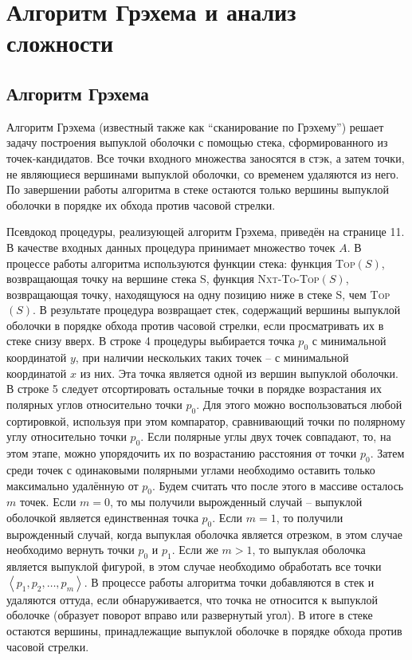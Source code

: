 \section{Алгоритм Грэхема и анализ сложности}

\subsection{Алгоритм Грэхема}

Алгоритм Грэхема (известный также как \textquotedblleft{}сканирование по Грэхему\textquotedblright{})\footnotemark{} решает задачу построения выпуклой оболочки с помощью стека, сформированного из точек-кандидатов. Все точки входного множества заносятся в стэк, а затем точки, не являющиеся вершинами выпуклой оболочки, со временем удаляются из него. По завершении работы алгоритма в стеке остаются только вершины выпуклой оболочки в порядке их обхода против часовой стрелки.


Псевдокод процедуры, реализующей алгоритм Грэхема, приведён на странице 11. В качестве входных данных процедура принимает множество точек $A$. В процессе работы алгоритма используются функции стека: функция \textsc{Top}$(S)$, возвращающая точку на вершине стека S, функция \textsc{Nxt-To-Top}$(S)$, возвращающая точку, находящуюся на одну позицию ниже в стеке S, чем \textsc{Top}$(S)$. В результате процедура возвращает стек, содержащий вершины выпуклой оболочки в порядке обхода против часовой стрелки, если просматривать их в стеке снизу вверх.
В строке 4 процедуры выбирается точка $p_0$ с минимальной координатой $y$, при наличии нескольких таких точек -- с минимальной координатой $x$ из них. Эта точка является одной из вершин выпуклой оболочки. В строке 5 следует отсортировать остальные точки в порядке возрастания их полярных углов относительно точки $p_0$. Для этого можно воспользоваться любой сортировкой, используя при этом компаратор, сравнивающий точки по полярному углу относительно точки $p_0$. Если полярные углы двух точек совпадают, то, на этом этапе, можно упорядочить их по возрастанию расстояния от точки $p_0$. Затем среди точек с одинаковыми полярными углами необходимо оставить только максимально удалённую от $p_0$. Будем считать что после этого в массиве осталось $m$ точек. Если $m = 0$, то мы получили вырожденный случай -- выпуклой оболочкой является единственная точка $p_0$. Если $m = 1$, то получили вырожденный случай, когда выпуклая оболочка является отрезком, в этом случае необходимо вернуть точки $p_0$ и $p_1$. Если же $m > 1$, то выпуклая оболочка является выпуклой фигурой, в этом случае необходимо обработать все точки $\left\langle p_1, p_2, \dots, p_m\right\rangle $. В процессе работы алгоритма точки добавляются в стек и удаляются оттуда, если обнаруживается, что точка не относится к выпуклой оболочке (образует поворот вправо или развернутый угол). В итоге в стеке остаются вершины, принадлежащие выпуклой оболочке в порядке обхода против часовой стрелки.

